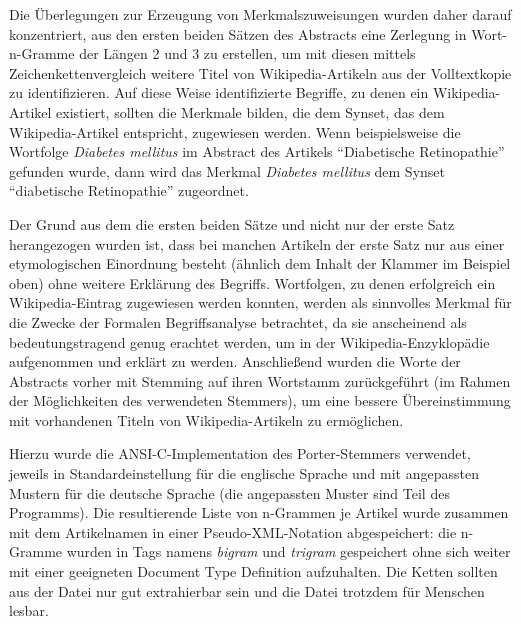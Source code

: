\documentclass[pagesize,paper=A4,DIV=calc,fontsize=12pt,draft=false]{scrreprt}
\begin{document}

Die Überlegungen zur Erzeugung von Merkmalszuweisungen wurden daher darauf konzentriert, aus den ersten beiden Sätzen des Abstracts eine Zerlegung in Wort-n-Gramme der Längen 2 und 3 zu erstellen, um mit diesen mittels Zeichenkettenvergleich weitere Titel von Wikipedia-Artikeln aus der Volltextkopie zu identifizieren.
Auf diese Weise identifizierte Begriffe, zu denen ein Wikipedia-Artikel existiert, sollten die Merkmale bilden, die dem Synset, das dem Wikipedia-Artikel entspricht, zugewiesen werden. 
Wenn beispielsweise die Wortfolge \textit{Diabetes mellitus} im Abstract des Artikels \enquote{Diabetische Retinopathie} gefunden wurde, dann wird das Merkmal \textit{Diabetes mellitus} dem Synset \enquote{diabetische Retinopathie} zugeordnet.

Der Grund aus dem die ersten beiden Sätze und nicht nur der erste Satz herangezogen wurden ist, dass bei manchen Artikeln der erste Satz nur aus einer etymologischen Einordnung besteht (ähnlich dem Inhalt der Klammer im Beispiel oben) ohne weitere Erklärung des Begriffs. 
Wortfolgen, zu denen erfolgreich ein Wikipedia-Eintrag zugewiesen werden konnten, werden als sinnvolles Merkmal für die Zwecke der Formalen Begriffsanalyse betrachtet, da sie anscheinend als bedeutungstragend genug erachtet werden, um in der Wikipedia-Enzyklopädie aufgenommen und erklärt zu werden. Anschließend wurden die Worte der Abstracts vorher mit Stemming auf ihren Wortstamm zurückgeführt (im Rahmen der Möglichkeiten des verwendeten Stemmers), um eine bessere Übereinstimmung mit vorhandenen Titeln von Wikipedia-Artikeln zu ermöglichen.

Hierzu wurde die ANSI-C-Implementation des Porter-Stemmers verwendet, jeweils in Standardeinstellung für die englische Sprache und mit angepassten Mustern für die deutsche Sprache (die angepassten Muster sind Teil des Programms). 
Die resultierende Liste von n-Grammen je Artikel wurde zusammen mit dem Artikelnamen in einer Pseudo-XML-Notation abgespeichert: die n-Gramme wurden in Tags namens \emph{bigram} und \emph{trigram} gespeichert ohne sich weiter mit einer geeigneten Document Type Definition aufzuhalten. 
Die Ketten sollten aus der Datei nur gut extrahierbar sein und die Datei trotzdem für Menschen lesbar.
\end{document}
